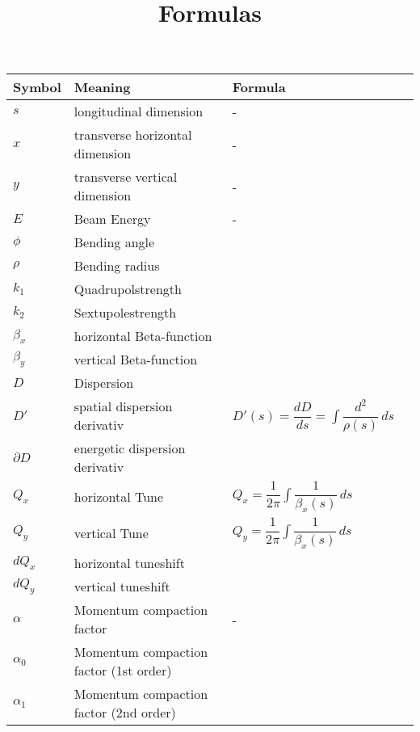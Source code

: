\documentclass[a4paper,11pt]{article}
\title{\textbf{Formulas}}
\author{}
\date{}
\begin{document}
\maketitle

\begin{tabular}{lllp{6cm}}
\toprule
\textbf{Symbol} & \textbf{Meaning} & \textbf{Formula} \\
\midrule
$s$& longitudinal dimension &- \\
$x$& transverse horizontal dimension&- \\
$y$&transverse vertical dimension&- \\
$E$&Beam Energy&-\\
$\phi$& Bending angle&\\
$\rho$& Bending radius& \\
$k_1$& Quadrupolstrength & \\
$k_2$& Sextupolestrength & \\
$\beta_x$ & horizontal Beta-function  &  \\
$\beta_y$ & vertical Beta-function  &  \\
$D$ & Dispersion &  \\
$D'$ & spatial dispersion derivativ & $D'(s) = \dfrac{dD}{ds} =\int \dfrac{d^2}{\rho(s)}\,ds$ \\
$\partial D$& energetic dispersion derivativ & \\
$Q_x$ & horizontal Tune  & $Q_x = \dfrac{1}{2\pi} \int \dfrac{1}{\beta_x(s)} \, ds$ \\
$Q_y$ & vertical Tune  & $Q_y = \dfrac{1}{2\pi} \int \dfrac{1}{\beta_x(s)} \, ds$ \\
$dQ_x$& horizontal tuneshift& \\
$dQ_y$& vertical tuneshift& \\
$\alpha$& Momentum compaction factor &-\\
$\alpha_0$& Momentum compaction factor (1st order)& \\
$\alpha_1$& Momentum compaction factor (2nd order)& \\


\end{tabular}
\end{document}
